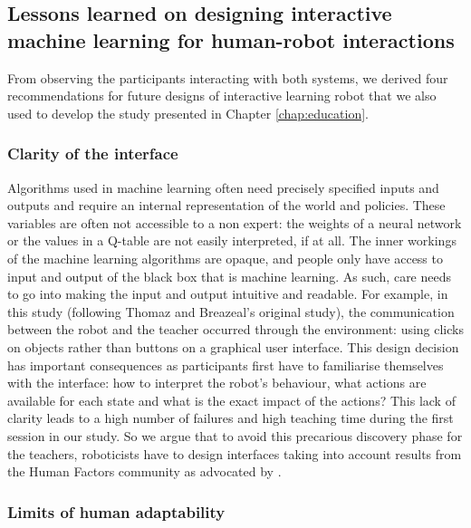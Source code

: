 \subsection{Lessons learned on designing interactive machine learning for human-robot interactions}

From observing the participants interacting with both systems, we derived four recommendations for future designs of interactive learning robot that we also used to develop the study presented in Chapter \ref{chap:education}. 

\subsubsection{Clarity of the interface}

Algorithms used in machine learning often need precisely specified inputs and outputs and require an internal representation of the world and policies. These variables are often not accessible to a non expert: the weights of a neural network or the values in a Q-table are not easily interpreted, if at all. The inner workings of the machine learning algorithms are opaque, and people only have access to input and output of the black box that is machine learning. As such, care needs to go into making the input and output intuitive and readable. For example, in this study (following Thomaz and Breazeal's original study), the communication between the robot and the teacher occurred through the environment: using clicks on objects rather than buttons on a graphical user interface. This design decision has important consequences as participants first have to familiarise themselves with the interface: how to interpret the robot's behaviour, what actions are available for each state and what is the exact impact of the actions? This lack of clarity leads to a high number of failures and high teaching time during the first session in our study. So we argue that to avoid this precarious discovery phase for the teachers, roboticists have to design interfaces taking into account results from the Human Factors community as advocated by \cite{adams2002critical}.

\subsubsection{Limits of human adaptability}

